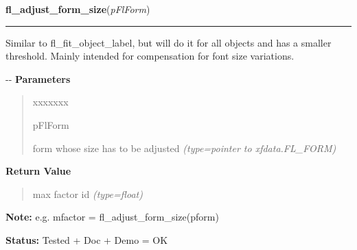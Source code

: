     \vspace{0.5ex}

\hspace{.8\funcindent}\begin{boxedminipage}{\funcwidth}

    \raggedright \textbf{fl\_adjust\_form\_size}(\textit{pFlForm})

    \vspace{-1.5ex}

    \rule{\textwidth}{0.5\fboxrule}
\setlength{\parskip}{2ex}

Similar to fl\_fit\_object\_label, but will do it for all objects and
has a smaller threshold. Mainly intended for compensation for font size
variations.

-{}-
\setlength{\parskip}{1ex}
      \textbf{Parameters}
      \vspace{-1ex}

      \begin{quote}
        \begin{Ventry}{xxxxxxx}

          \item[pFlForm]


form whose size has to be adjusted
            {\it (type=pointer to xfdata.FL\_FORM)}

        \end{Ventry}

      \end{quote}

      \textbf{Return Value}
    \vspace{-1ex}

      \begin{quote}

max factor id
      {\it (type=float)}

      \end{quote}

\textbf{Note:} 
e.g. mfactor = fl\_adjust\_form\_size(pform)


\textbf{Status:} 
Tested + Doc + Demo = OK


    \end{boxedminipage}

    \label{xformslib:flbasic:fl_form_is_visible}

    \vspace{0.5ex}


